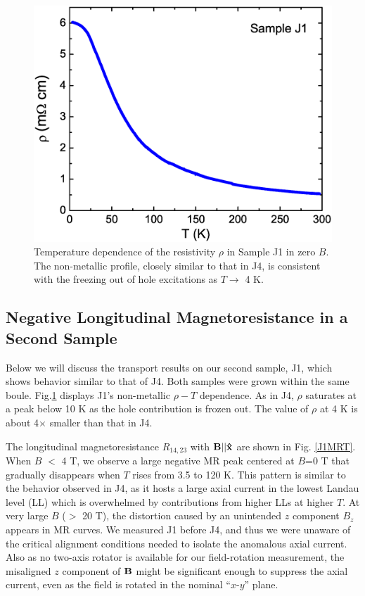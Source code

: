 \begin{figure}[!htbp]
  \begin{center}
\includegraphics[width=0.75\linewidth]{ch-na3bi/figures/FigJ1rho.eps}
\caption{\label{J1rho} 
Temperature dependence of the resistivity $\rho$ in Sample J1 in zero $B$. The non-metallic profile, closely similar to that in J4, is consistent with
the freezing out of hole excitations as $T\to$ 4 K. 
}
  \end{center}
\end{figure}

\subsection{Negative Longitudinal Magnetoresistance in a Second Sample}
Below we will discuss the transport results on our second sample, J1, which shows behavior similar to that of J4. Both samples were grown within the same boule. Fig.\ref{J1rho} displays J1's non-metallic $\rho-T$ dependence. As in J4, $\rho$ saturates at a peak below 10 K as the hole contribution is frozen out. The value of $\rho$ at 4 K is about 4$\times$ smaller than that in J4. 


The longitudinal magnetoresistance $R_{14,23}$ with $\bf B||\hat{x}$ are shown in Fig. \ref{J1MRT}. When $B$ $<$ 4 T, we observe a large negative MR peak centered at $B$=0 T that gradually disappears when $T$ rises from 3.5 to 120 K. This pattern is similar to the behavior observed in J4, as it hosts a large axial current in the lowest Landau level (LL) which is overwhelmed by contributions from higher LLs at higher $T$. At very large $B$ ($>$ 20 T), the distortion caused by an unintended $z$ component $B_z$ appears in MR curves. 
We measured J1 before J4, and thus we were unaware of the critical alignment conditions needed to isolate the anomalous axial current. Also as no two-axis rotator is available for our field-rotation measurement, the misaligned $z$ component of $\bf B$ might be significant enough to suppress the axial current, even as the field is rotated in the nominal ``$x$-$y$'' plane. 

